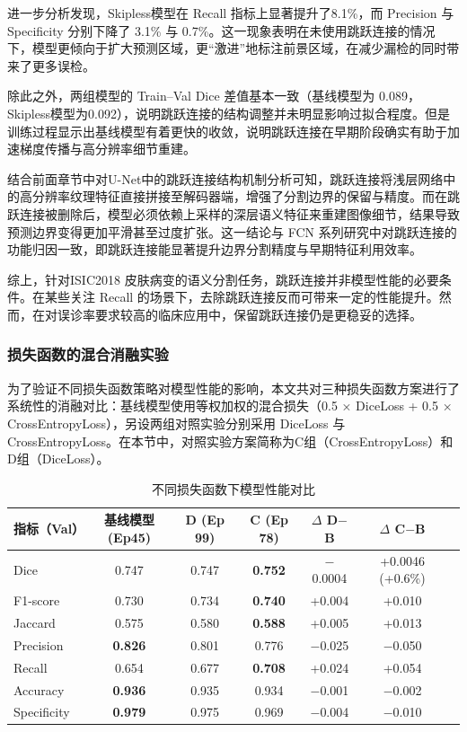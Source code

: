 进一步分析发现，Skipless模型在 Recall 指标上显著提升了8.1\%，而 Precision 与 Specificity 分别下降了 3.1\% 与 0.7\%。这一现象表明在未使用跳跃连接的情况下，模型更倾向于扩大预测区域，更“激进”地标注前景区域，在减少漏检的同时带来了更多误检。

除此之外，两组模型的 Train–Val Dice 差值基本一致（基线模型为 0.089，Skipless模型为0.092），说明跳跃连接的结构调整并未明显影响过拟合程度。但是训练过程显示出基线模型有着更快的收敛，说明跳跃连接在早期阶段确实有助于加速梯度传播与高分辨率细节重建。

结合前面章节中对U-Net中的跳跃连接结构机制分析可知，跳跃连接将浅层网络中的高分辨率纹理特征直接拼接至解码器端，增强了分割边界的保留与精度。而在跳跃连接被删除后，模型必须依赖上采样的深层语义特征来重建图像细节，结果导致预测边界变得更加平滑甚至过度扩张。这一结论与 FCN 系列研究中对跳跃连接的功能归因一致，即跳跃连接能显著提升边界分割精度与早期特征利用效率\cite{milletari2016}。

综上，针对ISIC2018 皮肤病变的语义分割任务，跳跃连接并非模型性能的必要条件。在某些关注 Recall 的场景下，去除跳跃连接反而可带来一定的性能提升。然而，在对误诊率要求较高的临床应用中，保留跳跃连接仍是更稳妥的选择。

\subsubsection{损失函数的混合消融实验}

为了验证不同损失函数策略对模型性能的影响，本文共对三种损失函数方案进行了系统性的消融对比：基线模型使用等权加权的混合损失（0.5 × DiceLoss + 0.5 × CrossEntropyLoss），另设两组对照实验分别采用 DiceLoss 与 CrossEntropyLoss。在本节中，对照实验方案简称为C组（CrossEntropyLoss）和D组（DiceLoss）。

\begin{table}[htbp]
    \centering
    \caption{不同损失函数下模型性能对比}
    \label{tab:loss_ablation}
    \begin{tabular}{lcccccc}
        \toprule
        指标（Val） & 基线模型(Ep45) & D (Ep 99) & C (Ep 78) & $\Delta$ D$-$B & $\Delta$ C$-$B \\
        \midrule
        Dice        & 0.747 & 0.747 & \textbf{0.752} & $-$0.0004 & +0.0046 (+0.6\%) \\
        F1-score    & 0.730 & 0.734 & \textbf{0.740} & +0.004 & +0.010 \\
        Jaccard     & 0.575 & 0.580 & \textbf{0.588} & +0.005 & +0.013 \\
        Precision   & \textbf{0.826} & 0.801 & 0.776 & $-$0.025 & $-$0.050 \\
        Recall      & 0.654 & 0.677 & \textbf{0.708} & +0.024 & +0.054 \\
        Accuracy    & \textbf{0.936} & 0.935 & 0.934 & $-$0.001 & $-$0.002 \\
        Specificity & \textbf{0.979} & 0.975 & 0.969 & $-$0.004 & $-$0.010 \\
        \bottomrule
    \end{tabular}
\end{table}


